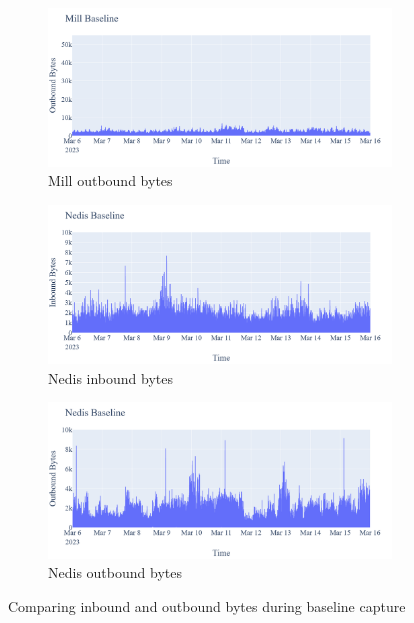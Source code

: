 \begin{figure}[H]
\begin{subfigure}[b]{0.4\textwidth}
    \end{subfigure}
    \begin{subfigure}[b]{0.4\textwidth}
        \includegraphics[width=\textwidth]{figures/Mill_Baseline_OutboundBytes.png}
        \caption{Mill outbound bytes}
    \end{subfigure}
    \begin{subfigure}[b]{0.4\textwidth}
        \includegraphics[width=\textwidth]{figures/Nedis_Baseline_InboundBytes.png}
        \caption{Nedis inbound bytes}
    \end{subfigure}
    \begin{subfigure}[b]{0.4\textwidth}
        \includegraphics[width=\textwidth]{figures/Nedis_Baseline_OutboundBytes.png}
        \caption{Nedis outbound bytes}
    \end{subfigure}
    \caption{Comparing inbound and outbound bytes during baseline capture}
    \label{Fig:CompareBaselineOutandInboundBytes}
 \end{figure}

